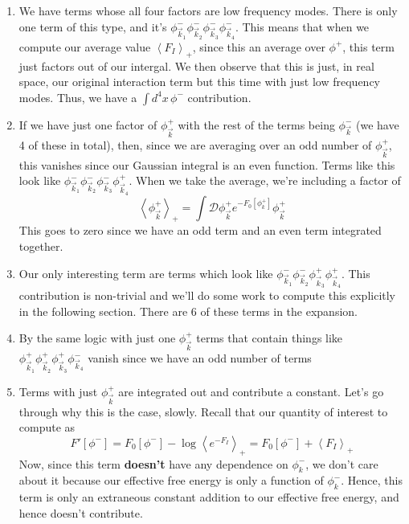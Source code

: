 \begin{enumerate}
	\item We have terms whose all four factors 
		are low frequency modes. There is only 
		one term of this type, and it's 
		$ \phi _{ \vec{k} _ 1 } ^ - \phi _{ \vec{k} _  2  } ^ - 
		\phi _{ \vec{k} _ 3 } ^ - \phi _{ \vec{k} _ 4 } ^ - $.
		This means that when we compute our 
		average value $ \left< F _ I  \right>_ + $, 
		since this an average over $ \phi ^ + $, 
		this term just factors out of our intergal. 
		We then observe that this is just, in real space, 
		our original interaction term but
		this time with just low frequency modes. 
		Thus, we have a  $ \int d ^ 4 x \, \phi ^ - $ 
		contribution. 
	\item If we have just one factor of $ \phi _{ \vec{k} } ^ +  $
		with the rest of the terms being 
		$ \phi _{ \vec{k} } ^ - $ (we have 
		4 of these in total), then, since we are 
		averaging over an odd number of $ \phi _{ \vec{k} } ^ + $, 
		this vanishes since our Gaussian integral is an 
		even function. Terms like this 
		look like $ \phi_{ \vec{k} _ 1 } ^ - 
		\phi _{ \vec{k} _ 2 } ^ - \phi _{ \vec{k} _ 3 } ^ - 
		\phi _{ \vec{k} _ 4 } ^ + $. When we take the 
		average, we're including a factor 
		of 
		\[
		\left< \phi _{ \vec{k}} ^ +  \right>_ + 
		 = \int \mathcal{ D } \phi_{ \vec{k}} ^ + e ^{ - 
		 F _ 0 [ \phi _{ k } ^ +  ] } \phi_{ \vec{k} } ^ + 
		\] This goes to zero since we have an 
		odd term and an even term integrated together. 
	\item Our only interesting term are terms 
		which look like $ \phi _{ \vec{k} _ 1} ^ - 
		\phi _{ \vec{k} _ 2}  ^- \phi _{ \vec{k} _ 3 } ^ + 
		\phi _{ \vec{k} _ 4} ^ +  $. This contribution is 
		non-trivial and we'll do some work to compute this 
		explicitly in the following section. There 
		are 6 of these terms in the expansion. 
	\item By the same logic with just one $ \phi _{ \vec{k} } ^ + $
		terms that contain things like $
		\phi _{ \vec{k} _ 1 } ^ + \phi _{ \vec{k} _ 2 }^ + 
		\phi _{ \vec{k} _ 3} ^ + \phi _{ \vec{k} _ 4 } ^ -  $
		vanish since we have an odd number of terms 
	\item Terms with just $ \phi _{ \vec{k} } ^ + $ are integrated 
		out and contribute a constant. Let's 
		go through why this 
		is the case, slowly. Recall that our quantity 
		of interest to compute as 
		\[
		 F ' [ \phi ^ -  ] = F_ 0 [ \phi ^ - ] 
		   - \log \left< e ^{ - F _ I } \right>_ +  = 
		   F_ 0 [ \phi ^ - ] + \left< F _ I  \right>_ +  
		\] Now, since this term \textbf{doesn't } have 
		any dependence on $ \phi _ k ^ -   $,
		we don't care about it because our 
		effective free energy is only a function 
		of  $ \phi _ k ^ - $. Hence, this 
		term is only an extraneous constant addition to 
		our effective free energy, and hence 
		doesn't contribute. 
\end{enumerate}
 

